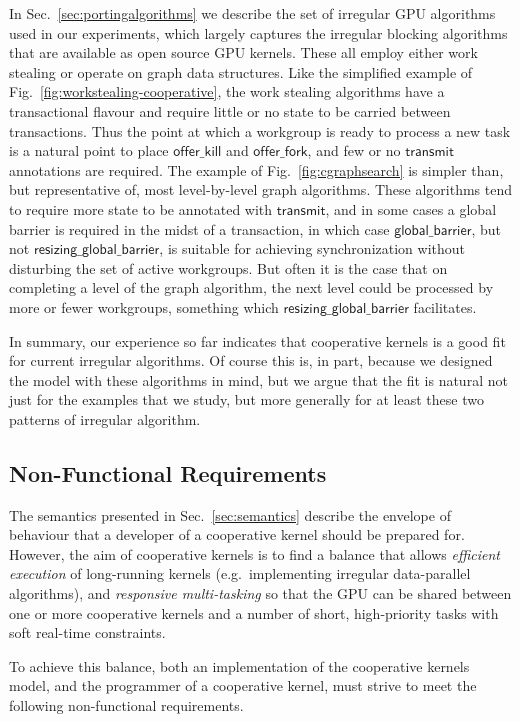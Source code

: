\documentclass[numbers,nocopyrightspace,10pt]{sigplanconf}
\newcommand{\myfig}{Fig.~}
\newcommand{\mysec}{Sec.~}
\newcommand{\transmit}{\mathsf{transmit}}
\newcommand{\offerfork}{\mathsf{offer\_fork}}
\newcommand{\offerkill}{\mathsf{offer\_kill}}
\newcommand{\globalbarrier}{\mathsf{global\_barrier}}
\newcommand{\resizingglobalbarrier}{\mathsf{resizing\_global\_barrier}}
\begin{document}
In \mysec\ref{sec:portingalgorithms} we describe the set of irregular GPU algorithms used
in our experiments, which largely captures the irregular blocking
algorithms that are available as open source GPU kernels.  These all
employ either work stealing or operate on graph data structures.
Like the simplified example of \myfig\ref{fig:workstealing-cooperative}, the work stealing algorithms have a transactional flavour
and require little or no state to be carried between transactions.  Thus the point at which a workgroup is ready to process a new task is a natural point to place $\offerkill$ and $\offerfork$, and few or no $\transmit$ annotations are required.
%
The example of \myfig\ref{fig:cgraphsearch} is simpler than, but representative of,
most level-by-level graph algorithms.  These algorithms tend to
require more state to be annotated with $\transmit$, and in some cases
a global barrier is required in the midst of a transaction, in which
case $\globalbarrier$, but not $\resizingglobalbarrier$, is suitable
for achieving synchronization without disturbing the set of active
workgroups.  But often it is the case that on completing a level of
the graph algorithm, the next level could be processed by more or
fewer workgroups, something which $\resizingglobalbarrier$
facilitates.

In summary, our experience so far indicates that cooperative kernels
is a good fit for current irregular algorithms.  Of course this is, in
part, because we designed the model with these algorithms in mind, but
we argue that the fit is natural not just for the examples that we
study, but more generally for at least these two patterns of irregular
algorithm.


\subsection{Non-Functional Requirements}\label{sec:nonfunctional}

The semantics presented in \mysec\ref{sec:semantics} describe the envelope of
behaviour that a developer of a cooperative kernel should be prepared
for.
%
However, the aim of cooperative kernels is to find a balance that
allows \emph{efficient execution} of long-running kernels
(e.g.\ implementing irregular data-parallel algorithms), and
\emph{responsive multi-tasking} so that the GPU can be shared between
one or more cooperative kernels and a number of short, high-priority
tasks with soft real-time constraints.

To achieve this balance, both an implementation of the cooperative
kernels model, and the programmer of a cooperative kernel, must strive
to meet the following non-functional requirements.
\end{document}
